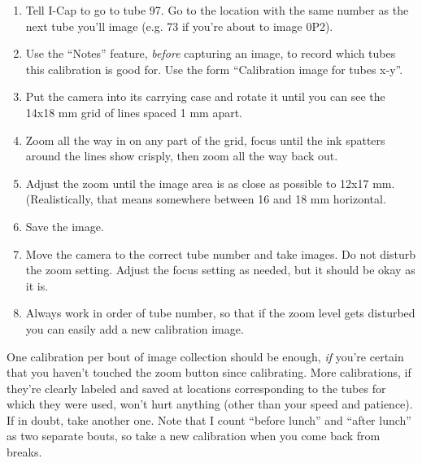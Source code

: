 \documentclass[11pt]{article}
\begin{document}
\begin{enumerate}
	\item{Tell I-Cap to go to tube 97. Go to the location with the same number as the next tube you'll image (e.g. 73 if you're about to image 0P2).}
	\item{Use the ``Notes'' feature, \textit{before} capturing an image, to record which tubes this calibration is good for. Use the form ``Calibration image for tubes x-y''.}
	\item{Put the camera into its carrying case and rotate it until you can see the 14x18 mm grid of lines spaced 1 mm apart.}
	\item{Zoom all the way in on any part of the grid, focus until the ink spatters around the lines show crisply, then zoom all the way back out.}
	\item{Adjust the zoom until the image area is as close as possible to 12x17 mm. (Realistically, that means somewhere between 16 and 18 mm horizontal.}
	\item{Save the image.}
	\item{Move the camera to the correct tube number and take images. Do not disturb the zoom setting. Adjust the focus setting as needed, but it should be okay as it is.}
	\item{Always work in order of tube number, so that if the zoom level gets disturbed you can easily add a new calibration image.} 
\end{enumerate}
	
	One calibration per bout of image collection should be enough, \textit{if} you're certain that you haven't touched the zoom button since calibrating. More calibrations, if they're clearly labeled and saved at locations corresponding to the tubes for which they were used, won't hurt anything (other than your speed and patience). If in doubt, take another one. Note that I count ``before lunch'' and ``after lunch'' as two separate bouts, so take a new calibration when you come back from breaks. 
\end{document}
